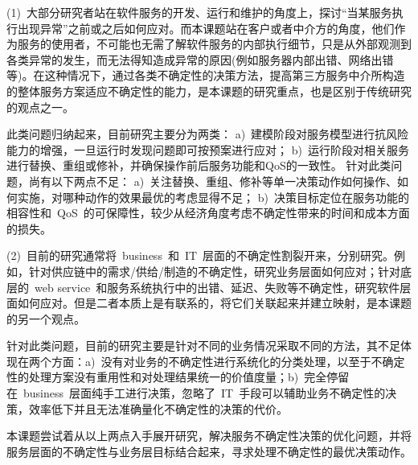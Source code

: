 (1)~大部分研究者站在软件服务的开发、运行和维护的角度上，探讨“当某服务执行出现异常”之前或之后如何应对。而本课题站在客户或者中介方的角度，他们作为服务的使用者，不可能也无需了解软件服务的内部执行细节，只是从外部观测到各类异常的发生，而无法得知造成异常的原因(例如服务器内部出错、网络出错等)。在这种情况下，通过各类不确定性的决策方法，提高第三方服务中介所构造的整体服务方案适应不确定性的能力，是本课题的研究重点，也是区别于传统研究的观点之一。

此类问题归纳起来，目前研究主要分为两类：
a)~建模阶段对服务模型进行抗风险能力的增强，一旦运行时发现问题即可按预案进行应对；
b)~运行阶段对相关服务进行替换、重组或修补，并确保操作前后服务功能和QoS的一致性。
针对此类问题，尚有以下两点不足：
a)~关注替换、重组、修补等单一决策动作如何操作、如何实施，对哪种动作的效果最优的考虑显得不足；
b)~决策目标定位在服务功能的相容性和~QoS~的可保障性，较少从经济角度考虑不确定性带来的时间和成本方面的损失。

(2)~目前的研究通常将~business~和~IT~层面的不确定性割裂开来，分别研究。例如，针对供应链中的需求/供给/制造的不确定性，研究业务层面如何应对；针对底层的~web service~和服务系统执行中的出错、延迟、失败等不确定性，研究软件层面如何应对。但是二者本质上是有联系的，将它们关联起来并建立映射，是本课题的另一个观点。

针对此类问题，目前的研究主要是针对不同的业务情况采取不同的方法，其不足体现在两个方面：a)~没有对业务的不确定性进行系统化的分类处理，以至于不确定性的处理方案没有重用性和对处理结果统一的价值度量；b)~完全停留在~business~层面纯手工进行决策，忽略了~IT~手段可以辅助业务不确定性的决策，效率低下并且无法准确量化不确定性的决策的代价。

本课题尝试着从以上两点入手展开研究，解决服务不确定性决策的优化问题，并将服务层面的不确定性与业务层目标结合起来，寻求处理不确定性的最优决策动作。



